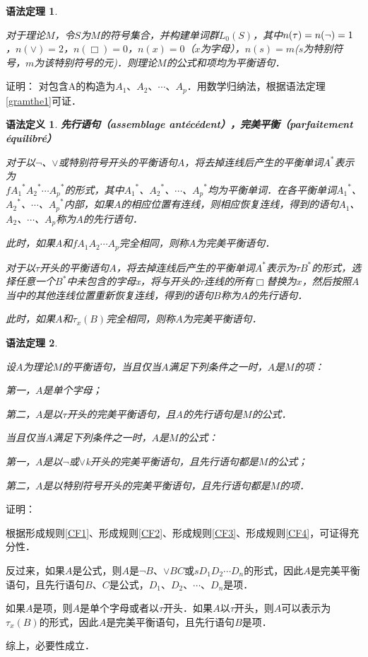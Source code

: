 \documentclass[12pt, a4paper, oneside]{book}
\newtheorem{gramdef}{语法定义}
\newtheorem{gramthe}{语法定理}
\begin{document}
			\begin{gramthe}\label{gramthe7}
				\hfill\par
				对于理论$M$，令$S$为$M$的符号集合，并构建单词群$L_0(S)$，其中$n(\tau)=n(\neg)\\=1$，$n(\lor)=2$，$n(\Box)=0$，$n(x)=0$（$x$为字母），$n(s)=m$($s$为特别符号，$m$为该特别符号的元)．则理论$M$的公式和项均为平衡语句．			
			\end{gramthe}			
			证明：
			对包含A的构造为$A_1$、$A_2$、$\cdots$、$A_p$．用数学归纳法，根据语法定理\ref{gramthe1}可证．			
			
			\begin{gramdef}
				\textbf{先行语句（assemblage antécédent），完美平衡（parfaitement \\équilibré）}
				\par
				对于以$\neg$、$\lor$或特别符号开头的平衡语句$A$，将去掉连线后产生的平衡单词$A^*$表示为\\$f{A_1}^*{A_2}^*\cdots {A_p}^*$的形式，其中${A_1}^*$、${A_2}^*$、$\cdots$、${A_p}^*$均为平衡单词．在各平衡单词${A_1}^*$、${A_2}^*$、$\cdots$、${A_p}^*$内部，如果$A$的相应位置有连线，则相应恢复连线，得到的语句$A_1$、$A_2$、$\cdots$、$A_p$称为$A$的先行语句．
				\par
				此时，如果A和$fA_1A_2\cdots A_p$完全相同，则称$A$为完美平衡语句．
				\par
				对于以$\tau$开头的平衡语句$A$，将去掉连线后产生的平衡单词$A^*$表示为$\tau B^*$的形式，选择任意一个$B^*$中未包含的字母x，将与开头的$\tau$连线的所有$\Box$替换为$x$，然后按照$A$当中的其他连线位置重新恢复连线，得到的语句$B$称为$A$的先行语句．
				\par
				此时，如果$A$和$\tau_x(B)$完全相同，则称$A$为完美平衡语句．			
			\end{gramdef}
			
			\begin{gramthe}\label{gramthe8}
				\hfill\par			
				设$A$为理论$M$的平衡语句，当且仅当$A$满足下列条件之一时，$A$是$M$的项：
				\par
				第一，$A$是单个字母；
				\par
				第二，$A$是以$\tau$开头的完美平衡语句，且A的先行语句是$M$的公式．
				\par
				当且仅当$A$满足下列条件之一时，$A$是$M$的公式：
				\par
				第一，$A$是以$\neg$或$\lor$k开头的完美平衡语句，且先行语句都是$M$的公式；
				\par
				第二，$A$是以特别符号开头的完美平衡语句，且先行语句都是$M$的项．
			\end{gramthe}			
			证明：
			\par
			根据形成规则\ref{CF1}、形成规则\ref{CF2}、形成规则\ref{CF3}、形成规则\ref{CF4}，可证得充分性．
			\par
			反过来，如果$A$是公式，则$A$是$\neg B$、$\lor BC$或$sD_1D_2\cdots D_n$的形式，因此$A$是完美平衡语句，且先行语句$B$、$C$是公式，$D_1$、$D_2$、$\cdots$、$D_n$是项．
			\par
			如果$A$是项，则$A$是单个字母或者以$\tau$开头．如果$A$以$\tau$开头，则$A$可以表示为$\tau_x(B)$的形式，因此$A$是完美平衡语句，且先行语句$B$是项．
			\par
			综上，必要性成立．
\end{document}
